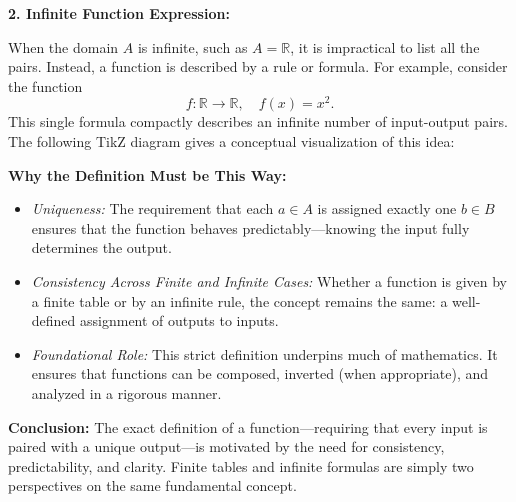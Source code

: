 \documentclass[12pt]{article}
\begin{document}
\vspace{0.5cm}
\textbf{2. Infinite Function Expression:}

When the domain $A$ is infinite, such as $A = \mathbb{R}$, it is impractical to list all the pairs. Instead, a function is described by a rule or formula. For example, consider the function 
\[
f: \mathbb{R} \to \mathbb{R}, \quad f(x) = x^2.
\]
This single formula compactly describes an infinite number of input-output pairs. The following TikZ diagram gives a conceptual visualization of this idea:

\begin{center}
\end{center}

\vspace{0.5cm}
\textbf{Why the Definition Must be This Way:}

\begin{itemize}
\item \emph{Uniqueness:} The requirement that each $a \in A$ is assigned exactly one $b \in B$ ensures that the function behaves predictably—knowing the input fully determines the output.
\item \emph{Consistency Across Finite and Infinite Cases:} Whether a function is given by a finite table or by an infinite rule, the concept remains the same: a well-defined assignment of outputs to inputs.
\item \emph{Foundational Role:} This strict definition underpins much of mathematics. It ensures that functions can be composed, inverted (when appropriate), and analyzed in a rigorous manner.
\end{itemize}

\bigskip
\textbf{Conclusion:}  
The exact definition of a function—requiring that every input is paired with a unique output—is motivated by the need for consistency, predictability, and clarity. Finite tables and infinite formulas are simply two perspectives on the same fundamental concept.
\end{document}
